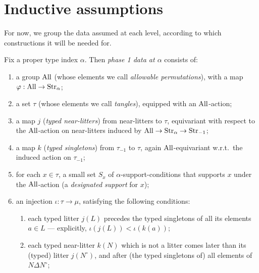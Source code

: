 \section{Inductive assumptions}

For now, we group the data assumed at each level, according to which constructions it will be needed for.

\begin{definition}
  \label{def:phase-1-data}

  Fix a proper type index $\alpha$.  Then \emph{phase 1 data at $\alpha$} consists of:
  \begin{enumerate}
    \item a group $\mathrm{All}$ (whose elements we call \emph{allowable permutations}), with a map $\varphi : \mathrm{All} \to \mathrm{Str}_\alpha$;
    \item a set $\tau$ (whose elements we call \emph{tangles}), equipped with an $\mathrm{All}$-action;
    \item a map $j$ (\emph{typed near-litters}) from near-litters to $\tau$, equivariant with respect to the $\mathrm{All}$-action on near-litters induced by $\mathrm{All} \to \mathrm{Str}_{\alpha} \to \mathrm{Str}_{-1}$;
    \item a map $k$ (\emph{typed singletons}) from $\tau_{-1}$ to $\tau$, again $\mathrm{All}$-equivariant w.r.t.\ the induced action on $\tau_{-1}$;
    \item for each $x \in \tau$, a small set $S_x$ of $\alpha$-support-conditions that supports $x$ under the $\mathrm{All}$-action (a \emph{designated support} for $x$);
    \item an injection $\iota : \tau \to \mu$, satisfying the following conditions:
    \begin{enumerate}
      \item each typed litter $j(L)$ precedes the typed singletons of all its elements $a \in L$ --- explicitly, $\iota(j(L)) < \iota(k(a))$;

      \item each typed near-litter $k(N)$ which is not a litter comes later than its (typed) litter $j(N^\circ)$, and after (the typed singletons of) all elements of $N \Delta N^\circ$;


\end{enumerate}
\end{enumerate}
\end{definition}
